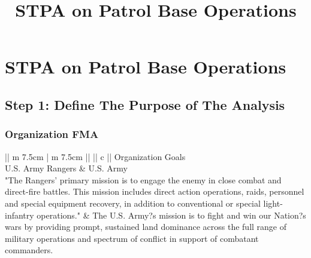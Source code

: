 \documentclass[../../main/main.tex]{subfiles}
\begin{document}
\title{STPA on Patrol Base Operations}

\chapter{STPA on Patrol Base Operations}\label{chp:stpapb}


\section{Step 1: Define The Purpose of The Analysis}\label{chp:stpapb:purpose}
\subsection{Organization FMA}

\begin{table}[h!]
\parskip=8pt
\begin{tabular}{||  m {7.5cm}  |  m {7.5cm}  ||}
\hline
{} {|| c ||} {Organization Goals} \\
 \hline
U.S. Army Rangers	& U.S. Army\\
\hline
"The Rangers' primary mission is to engage the enemy in close combat and direct-fire battles. This mission includes direct action operations, raids, personnel and special equipment recovery, in addition to conventional or special light-infantry operations."
&	
The U.S. Army?s mission is to fight and win our Nation?s wars by providing prompt, sustained land dominance across the full range of military operations and spectrum of conflict in support of combatant commanders.\\
\hline
\end{tabular}
\caption{Organization goals.}
\label{orgo}
\end{table}
\end{document}

